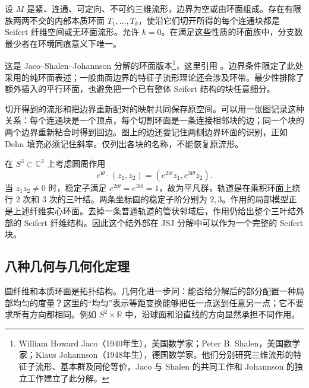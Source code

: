 \begin{theorem}[JSJ 分解]\label{g2:thm:JSJ-three}
	设 \(M\) 是紧、连通、可定向、不可约三维流形，边界为空或由环面组成。存在有限族两两不交的内部本质环面 \(T_1,\ldots,T_k\)，使沿它们切开所得的每个连通块都是 Seifert 纤维空间或无环面流形。允许 \(k=0\)。在满足这些性质的环面族中，分支数最少者在环境同痕意义下唯一。
\end{theorem}

这是 Jaco--Shalen--Johannson 分解的环面版本\footnote{William Howard Jaco（1940年生），美国数学家；Peter B. Shalen，美国数学家；Klaus Johannson（1948年生），德国数学家。他们分别研究三维流形的特征子流形、基本群及同伦等价，Jaco 与 Shalen 的共同工作和 Johannson 的独立工作建立了此分解。}，这里引用 \cite[第1.6节]{AschenbrennerFriedlWilton2015}。边界条件限定了此处采用的纯环面表述；一般曲面边界的特征子流形理论还会涉及环带。最少性排除了额外插入的平行环面，也避免把一个已有整体 Seifert 结构的块任意细分。

\ProseParagraphBreak

切开得到的流形和把边界重新配对的映射共同保存原空间。可以用一张图记录这种关系：每个连通块是一个顶点，每个切割环面是一条连接相邻块的边；同一个块的两个边界重新粘合时得到回边。图上的边还要记住两侧边界环面的识别，正如 Dehn 填充必须记住斜率。仅列出各块的名称，不能恢复原流形。

\begin{example}\label{g2:exm:seifert-trefoil-exterior}
	在 \(S^3\subset\mathbb C^2\) 上考虑圆周作用
	\[
		e^{\mathrm{i}\theta}\cdot(z_1,z_2)=(e^{2\mathrm{i}\theta}z_1,e^{3\mathrm{i}\theta}z_2).
	\]
	当 \(z_1z_2\ne0\) 时，稳定子满足 \(e^{2\mathrm{i}\theta}=e^{3\mathrm{i}\theta}=1\)，故为平凡群，轨道是在乘积环面上绕行 \(2\) 次和 \(3\) 次的三叶结。两条坐标圆的稳定子阶分别为 \(2,3\)。作用的局部模型正是上述纤维实心环面。去掉一条普通轨道的管状邻域后，作用仍给出整个三叶结外部的 Seifert 纤维结构。因此这个结外部在 JSJ 分解中可以作为一个完整的 Seifert 块。
\end{example}

\subsection{八种几何与几何化定理}
\label{g2:subsec:A04:04}

圆纤维和本质环面是拓扑结构。几何化进一步问：能否给分解后的部分配置一种局部均匀的度量？这里的“均匀”表示等距变换能够把任一点送到任意另一点；它不要求所有方向都相同。例如 \(S^2\times\mathbb R\) 中，沿球面和沿直线的方向显然承担不同作用。

